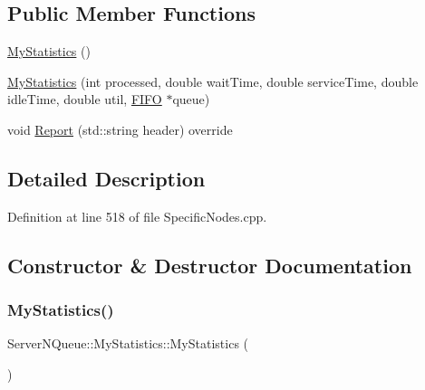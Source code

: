 \subsection*{Public Member Functions}
\begin{DoxyCompactItemize}
\item 
\hyperlink{class_server_n_queue_1_1_my_statistics_a18b48f5f7d68d793a1ba204f183f3d33}{My\+Statistics} ()
\item 
\hyperlink{class_server_n_queue_1_1_my_statistics_ac6ab7a50b89919760fd2eb60a777c1bd}{My\+Statistics} (int processed, double wait\+Time, double service\+Time, double idle\+Time, double util, \hyperlink{class_f_i_f_o}{F\+I\+FO} $\ast$queue)
\item 
void \hyperlink{class_server_n_queue_1_1_my_statistics_ae070c508a1934a43cc167dd6a8917d86}{Report} (std\+::string header) override
\end{DoxyCompactItemize}


\subsection{Detailed Description}


Definition at line 518 of file Specific\+Nodes.\+cpp.



\subsection{Constructor \& Destructor Documentation}
\mbox{\label{class_server_n_queue_1_1_my_statistics_a18b48f5f7d68d793a1ba204f183f3d33}} 
\subsubsection{\texorpdfstring{My\+Statistics()}{MyStatistics()}\hspace{0.1cm}{\footnotesize\ttfamily [1/2]}}
{\footnotesize\ttfamily Server\+N\+Queue\+::\+My\+Statistics\+::\+My\+Statistics (\begin{DoxyParamCaption}{ }\end{DoxyParamCaption})\hspace{0.3cm}{\ttfamily [inline]}}



